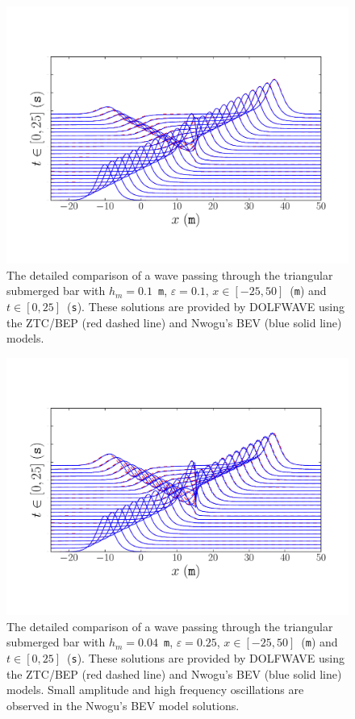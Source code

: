 \begin{figure}
  \centering
  \includegraphics[width=\largefig]{chapters/lopes/pdf/epsilon0_1.pdf}
  \caption{The detailed comparison of a wave passing through the
  triangular submerged bar with $h_m=0.1$~{\tt m}, $\varepsilon=0.1$,
  $x\in[-25,50]$~({\tt m}) and $t\in[0,25]$~({\tt s}).  These solutions
  are provided by DOLFWAVE using the ZTC/BEP (red dashed line) and
  Nwogu's BEV (blue solid line) models.}
  \label{fig:lopes:znspike01}
\end{figure}

\begin{figure}
  \centering
  \includegraphics[width=\largefig]{chapters/lopes/pdf/epsilon0_25.pdf}
  \caption{The detailed comparison of a wave passing through the
    triangular submerged bar with $h_m=0.04$~{\tt m}, $\varepsilon=0.25$,
    $x\in[-25,50]$~({\tt m}) and $t\in[0,25]$~({\tt s}).  These solutions
    are provided by DOLFWAVE using the ZTC/BEP (red dashed line) and
    Nwogu's BEV (blue solid line) models.  Small amplitude and high
    frequency oscillations are observed in the Nwogu's BEV model
    solutions.}
  \label{fig:lopes:znspike025}
\end{figure}

